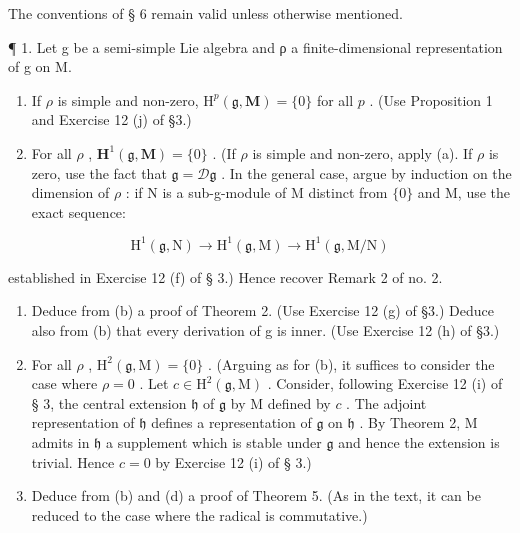 
The conventions of § 6 remain valid unless otherwise mentioned.

¶ 1. Let g be a semi-simple Lie algebra and ρ a finite-dimensional representation of g on M.

\begin{enumerate}
\def\labelenumi{(\alph{enumi})}
\item
  If \(\rho\) is simple and non-zero, \(\mathrm{H}^p (\mathfrak{g},\mathbf{M}) = \{0\}\) for all \(p\) . (Use Proposition 1 and Exercise 12 (j) of §3.)
\item
  For all \(\rho\) , \(\mathbf{H}^1(\mathfrak{g}, \mathbf{M}) = \{0\}\) . (If \(\rho\) is simple and non-zero, apply (a). If \(\rho\) is zero, use the fact that \(\mathfrak{g} = \mathcal{D}\mathfrak{g}\) . In the general case, argue by induction on the dimension of \(\rho\) : if N is a sub-g-module of M distinct from \(\{0\}\) and M, use the exact sequence:
\end{enumerate}

\[
\mathrm{H} ^ {1} (\mathfrak {g}, \mathrm{N}) \rightarrow \mathrm{H} ^ {1} (\mathfrak {g}, \mathrm{M}) \rightarrow \mathrm{H} ^ {1} (\mathfrak {g}, \mathrm{M} / \mathrm{N})
\]

established in Exercise 12 (f) of § 3.) Hence recover Remark 2 of no. 2.

\begin{enumerate}
\def\labelenumi{(\alph{enumi})}
\setcounter{enumi}{2}
\item
  Deduce from (b) a proof of Theorem 2. (Use Exercise 12 (g) of §3.) Deduce also from (b) that every derivation of g is inner. (Use Exercise 12 (h) of §3.)
\item
  For all \(\rho\) , \(\mathrm{H}^2(\mathfrak{g}, \mathrm{M}) = \{0\}\) . (Arguing as for (b), it suffices to consider the case where \(\rho = 0\) . Let \(c \in \mathrm{H}^2(\mathfrak{g}, \mathrm{M})\) . Consider, following Exercise 12 (i) of § 3, the central extension \(\mathfrak{h}\) of \(\mathfrak{g}\) by \(\mathrm{M}\) defined by \(c\) . The adjoint representation of \(\mathfrak{h}\) defines a representation of \(\mathfrak{g}\) on \(\mathfrak{h}\) . By Theorem 2, \(\mathrm{M}\) admits in \(\mathfrak{h}\) a supplement which is stable under \(\mathfrak{g}\) and hence the extension is trivial. Hence \(c = 0\) by Exercise 12 (i) of § 3.)
\item
  Deduce from (b) and (d) a proof of Theorem 5. (As in the text, it can be reduced to the case where the radical is commutative.)
\end{enumerate}

